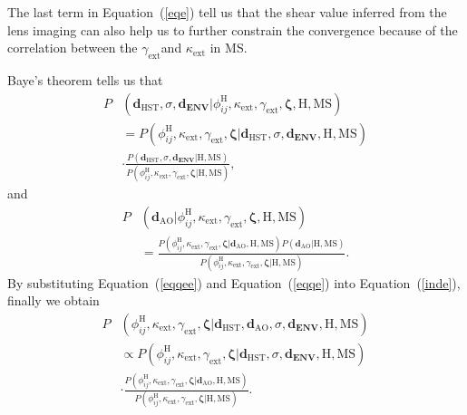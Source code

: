 \documentclass[useAMS,usenatbib]{mnras}
\newcommand{\eref}[1]{Equation~(\ref{#1})}
\begin{document}
The last term in \eref{eqe} tell us that the shear value inferred from the lens imaging can also help us to further constrain the convergence because of the correlation between the $\gamma_{\textrm{ext}}$and $\kappa_{\textrm{ext}}$ in MS.

Baye's theorem tells us that 
\begin{equation}
\label{eqqee}
\begin{split}
P&(\bm{d}_{\textrm{HST}},\sigma, \bm{d_{\textrm{ENV}}}|\phi_{ij}^{\textrm{H}},\kappa_{\textrm{ext}},\gamma_{\textrm{ext}},\bm{\zeta},\textrm{H},\textrm{MS})\\
&=P(\phi_{ij}^{\textrm{H}},\kappa_{\textrm{ext}},\gamma_{\textrm{ext}},\bm{\zeta}|\bm{d}_{\textrm{HST}},\sigma,\bm{d_{\textrm{ENV}}},\textrm{H},\textrm{MS})\\
&\cdot\frac{P(\bm{d}_{\textrm{HST}},\sigma,\bm{d_{\textrm{ENV}}}|\textrm{H},\textrm{MS})}{P(\phi_{ij}^{\textrm{H}},\kappa_{\textrm{ext}},\gamma_{\textrm{ext}},\bm{\zeta}|\textrm{H},\textrm{MS})},
\end{split}
\end{equation}
and
\begin{equation}
\label{eqqe}
    \begin{split}
        P&(\bm{d}_{\textrm{AO}}|\phi_{ij}^{\textrm{H}},\kappa_{\textrm{ext}},\gamma_{\textrm{ext}},\bm{\zeta},\textrm{H},\textrm{MS})\\
        &=\frac{P(\phi_{ij}^{\textrm{H}},\kappa_{\textrm{ext}},\gamma_{\textrm{ext}},\bm{\zeta}|\bm{d}_{\textrm{AO}},\textrm{H},\textrm{MS})P(\bm{d}_{\textrm{AO}}|\textrm{H},\textrm{MS})}{P(\phi_{ij}^{\textrm{H}},\kappa_{\textrm{ext}},\gamma_{\textrm{ext}},\bm{\zeta}|\textrm{H},\textrm{MS})}.
    \end{split}
\end{equation}
By substituting \eref{eqqee} and \eref{eqqe} into \eref{inde}, finally we obtain
\begin{equation}
\label{final}
\begin{split}
P&(\phi_{ij}^{\textrm{H}},\kappa_{\textrm{ext}},\gamma_{\textrm{ext}},\bm{\zeta}|\bm{d}_{\textrm{HST}},\bm{d}_{\textrm{AO}},\sigma, \bm{d_{\textrm{ENV}}},\textrm{H},\textrm{MS})\\
&\propto P(\phi_{ij}^{\textrm{H}},\kappa_{\textrm{ext}},\gamma_{\textrm{ext}},\bm{\zeta}|\bm{d}_{\textrm{HST}},\sigma, \bm{d_{\textrm{ENV}}},\textrm{H},\textrm{MS})\\
&\cdot\frac{P(\phi_{ij}^{\textrm{H}},\kappa_{\textrm{ext}},\gamma_{\textrm{ext}},\bm{\zeta}|\bm{d}_{\textrm{AO}},\textrm{H},\textrm{MS})}{P(\phi_{ij}^{\textrm{H}},\kappa_{\textrm{ext}},\gamma_{\textrm{ext}},\bm{\zeta}|\textrm{H},\textrm{MS})}.
\end{split}
\end{equation}
\end{document}
